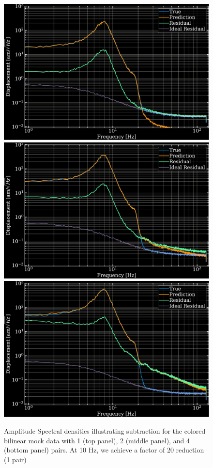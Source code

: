 \begin{refsection}
\begin{figure}[htbp]
   \centering
   \includegraphics[width=.7\columnwidth]{chapter_noise_sub/etc/spectra1C}
    \includegraphics[width=.7\columnwidth]{chapter_noise_sub/etc/spectra2C}
     \includegraphics[width=.7\columnwidth]{chapter_noise_sub/etc/spectra4C}
   \caption{Amplitude Spectral densities illustrating subtraction for the colored bilinear mock data with 1 (top panel), 2 (middle panel), and 4 (bottom panel) pairs. At 10 Hz, we achieve a factor of 20 reduction (1 pair)}
   \label{fig:ASD1}
\end{figure}


\end{refsection}
